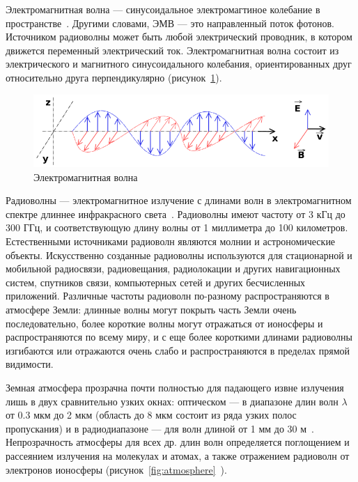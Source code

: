 Электромагнитная волна --- синусоидальное электромагтиное колебание в пространстве~\cite{meanders:radiovolny}. Другими словами, ЭМВ --- это направленный поток фотонов. Источником радиоволны может быть любой электрический проводник, в котором движется переменный электрический ток. Электромагнитная волна состоит из электрического и магнитного синусоидального колебания, ориентированных друг относительно друга перпендикулярно (рисунок~\ref{fig:emf}).

\begin{figure}[ht]
    \includegraphics[width=.8\linewidth]{Figures/emf.png}
    \caption{Электромагнитная волна}
    \label{fig:emf}
\end{figure}

Радиоволны --- электромагнитное излучение с длинами волн в электромагнитном спектре длиннее инфракрасного света~\cite{wiki:radiowaves}. Радиоволны имеют частоту от 3 кГц до 300 ГГц, и соответствующую длину волны от 1 миллиметра до 100 километров. Естественными источниками радиоволн являются молнии и астрономические объекты. Искусственно созданные радиоволны используются для стационарной и мобильной радиосвязи, радиовещания, радиолокации и других навигационных систем, спутников связи, компьютерных сетей и других бесчисленных приложений. Различные частоты радиоволн по-разному распространяются в атмосфере Земли: длинные волны могут покрыть часть Земли очень последовательно, более короткие волны могут отражаться от ионосферы и распространяются по всему миру, и с еще более короткими длинами радиоволны изгибаются или отражаются очень слабо и распространяются в пределах прямой видимости.

Земная атмосфера прозрачна почти полностью для падающего извне излучения лишь в двух сравнительно узких окнах: оптическом --- в диапазоне длин волн $\lambda$ от 0.3 мкм до 2 мкм (область до 8 мкм состоит из ряда узких полос пропускания) и в радиодиапазоне --- для волн длиной от 1 мм до 30 м~\cite{astronet:atmosphere}. Непрозрачность атмосферы для всех др. длин волн определяется поглощением и рассеянием излучения на молекулах и атомах, а также отражением радиоволн от электронов ионосферы (рисунок~\ref{fig:atmosphere}~\cite{wiki:radiowaves}).

